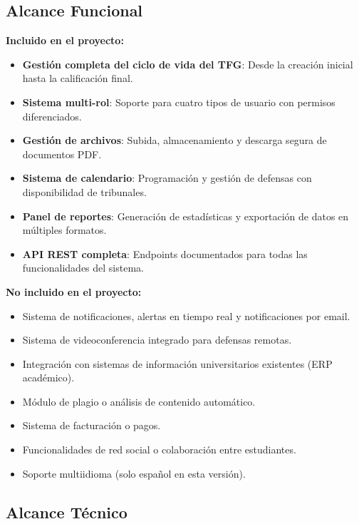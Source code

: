 \documentclass[12pt,a4paper,oneside]{report}
\providecommand{\tightlist}{%
  \setlength{\itemsep}{0pt}\setlength{\parskip}{0pt}}
\begin{document}
\subsection{Alcance Funcional}\label{alcance-funcional}

\textbf{Incluido en el proyecto:}

\begin{itemize}
\tightlist
\item
  \textbf{Gestión completa del ciclo de vida del TFG}: Desde la creación
  inicial hasta la calificación final.
\item
  \textbf{Sistema multi-rol}: Soporte para cuatro tipos de usuario con
  permisos diferenciados.
\item
  \textbf{Gestión de archivos}: Subida, almacenamiento y descarga segura
  de documentos PDF.
\item
  \textbf{Sistema de calendario}: Programación y gestión de defensas con
  disponibilidad de tribunales.
\item
  \textbf{Panel de reportes}: Generación de estadísticas y exportación
  de datos en múltiples formatos.
\item
  \textbf{API REST completa}: Endpoints documentados para todas las
  funcionalidades del sistema.
\end{itemize}

\textbf{No incluido en el proyecto:}

\begin{itemize}
\tightlist
\item
  Sistema de notificaciones, alertas en tiempo real y
  notificaciones por email.
\item
  Sistema de videoconferencia integrado para defensas remotas.
\item
  Integración con sistemas de información universitarios existentes (ERP
  académico).
\item
  Módulo de plagio o análisis de contenido automático.
\item
  Sistema de facturación o pagos.
\item
  Funcionalidades de red social o colaboración entre estudiantes.
\item
  Soporte multiidioma (solo español en esta versión).
\end{itemize}

\subsection{Alcance Técnico}\label{alcance-tuxe9cnico}
\end{document}
